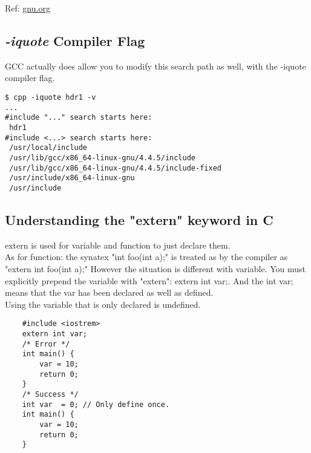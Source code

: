 \documentclass[a4paper, 12pt]{article}
\begin{document}
    Ref: \href{https://gcc.gnu.org/onlinedocs/cpp/Environment-Variables.html}{gnu.org}
    \subsection{\emph{-iquote} Compiler Flag}
    GCC actually does allow you to modify this search path as well, with the -iquote compiler flag.\\
    \begin{verbatim} 
$ cpp -iquote hdr1 -v
...
#include "..." search starts here:
 hdr1
#include <...> search starts here:
 /usr/local/include
 /usr/lib/gcc/x86_64-linux-gnu/4.4.5/include
 /usr/lib/gcc/x86_64-linux-gnu/4.4.5/include-fixed
 /usr/include/x86_64-linux-gnu
 /usr/include
    \end{verbatim}
    \subsection{Understanding the "extern" keyword in C}
    \textsf{extern} is used for variable and function to just declare them. \\
    As for function: the synatex \textsf{"int foo(int a);"} is treated as by the compiler as \textsf{"extern int foo(int a);"} However the situation is different with 
    variable. You must explicitly prepend the variable with "extern": \textsf{extern int var;}. And the \textsf{int var;} means that the var has been declared 
    as well as defined.\\
    Using the variable that is only declared is undefined. 
    \begin{verbatim}
    #include <iostrem>
    extern int var;
    /* Error */
    int main() {
        var = 10;
        return 0;
    }
    /* Success */
    int var  = 0; // Only define once.
    int main() {
        var = 10;
        return 0;
    }

    \end{verbatim}
\end{document}
